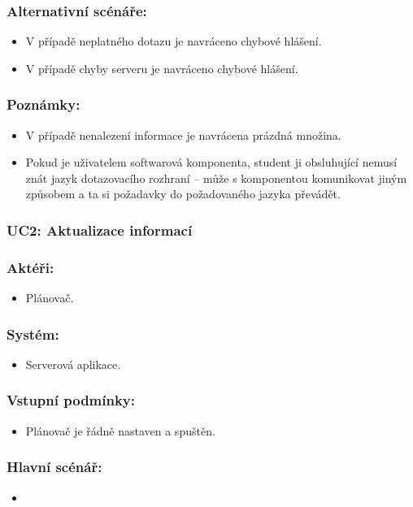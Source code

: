 \subsubsection*{Alternativní scénáře:}
\begin{itemize}
 \item V případě neplatného dotazu je navráceno chybové hlášení.
 \item V případě chyby serveru je navráceno chybové hlášení.
\end{itemize}
\subsubsection*{Poznámky:}
\begin{itemize}
 \item V případě nenalezení informace je navrácena prázdná množina.
 \item Pokud je uživatelem softwarová komponenta, student ji obsluhující nemusí znát jazyk dotazovacího rozhraní -- může s komponentou komunikovat jiným způsobem a ta si požadavky do požadovaného jazyka převádět.
\end{itemize}

\subsubsection{UC2: Aktualizace informací}
\subsubsection*{Aktéři:}
\begin{itemize}
 \item Plánovač.
\end{itemize}
\subsubsection*{Systém:}
\begin{itemize}
 \item Serverová aplikace.
\end{itemize}
\subsubsection*{Vstupní podmínky:}
\begin{itemize}
 \item Plánovač je řádně nastaven a spuštěn.
\end{itemize}
\subsubsection*{Hlavní scénář:}
\begin{itemize}
 \item 
\end{itemize}
